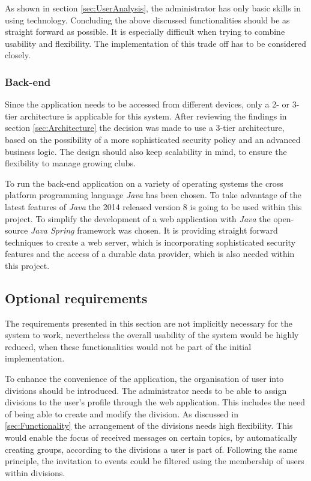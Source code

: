As shown in section \vref{sec:UserAnalysis}, the administrator has only basic skills in using technology. Concluding the above discussed functionalities should be as straight forward as possible. It is especially difficult when trying to combine usability and flexibility. The implementation of this trade off has to be considered closely.

\subsubsection{Back-end}

Since the application needs to be accessed from different devices, only a 2- or 3-tier architecture is applicable for this system. After reviewing the findings in section \vref{sec:Architecture} the decision was made to use a 3-tier architecture, based on the possibility of a more sophisticated security policy and an advanced business logic. The design should also keep scalability in mind, to ensure the flexibility to manage growing clubs.

To run the back-end application on a variety of operating systems the cross platform programming language \emph{Java} has been chosen. To take advantage of the latest features of \emph{Java} the 2014 released version 8 is going to be used within this project. To simplify the development of a web application with \emph{Java} the open-source \emph{Java Spring} framework was chosen. It is providing straight forward techniques to create a web server, which is incorporating sophisticated security features and the access of a durable data provider, which is also needed within this project.

\subsection{Optional requirements} %
The requirements presented in this section are not implicitly necessary for the system to work, nevertheless the overall usability of the system would be highly reduced, when these functionalities would not be part of the initial implementation.

To enhance the convenience of the application, the organisation of user into divisions should be introduced. The administrator needs to be able to assign divisions to the user's profile through the web application. This includes the need of being able to create and modify the division. As discussed in \vref{sec:Functionality} the arrangement of the divisions needs high flexibility. This would enable the focus of received messages on certain topics, by automatically creating groups, according to the divisions a user is part of. Following the same principle, the invitation to events could be filtered using the membership of users within divisions.


